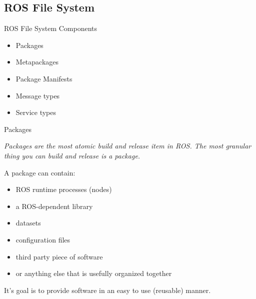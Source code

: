 \documentclass{beamer}
\begin{document}
\subsection{ROS File System}

\begin{frame}{ROS File System}	
	\large{Components}
	
	\begin{itemize}
		\item Packages
		\item Metapackages
		\item Package Manifests
		\item Message types
		\item Service types
		
	\end{itemize}
	
\end{frame}

\begin{frame}{Packages}	
	
	\begin{definition}[Package]
		\textit{Packages are the most atomic build and release item in ROS. The most granular thing you can build and release is a package. }
	\end{definition}	
	
	A package can contain: 
	\begin{itemize}
		\item ROS runtime processes (nodes)
		\item a ROS-dependent library
		\item datasets 
		\item configuration files
		\item third party piece of software
		\item or anything else that is usefully organized together
	\end{itemize}
	
	It's goal is to provide software in an easy to use (reusable) manner. \\	
		
\end{frame}

\end{document}
